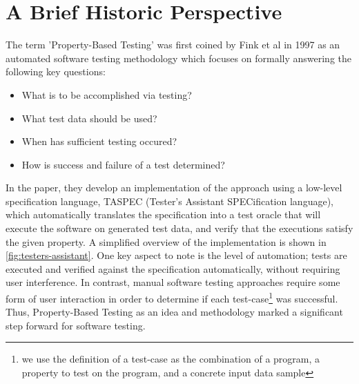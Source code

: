 \documentclass[twoside,11pt,openright]{report}
\newcommand{\pbt}{Property-Based Testing}
\begin{document}
\section{A Brief Historic Perspective}
The term 'Property-Based Testing' was first coined by Fink et al in 1997\cite{fink1997property} as an automated software testing methodology which focuses on formally answering the following key questions:
\begin{itemize}
    \item What is to be accomplished via testing?
    \item What test data should be used?
    \item When has sufficient testing occured?
    \item How is success and failure of a test determined?
\end{itemize}
In the paper, they develop an implementation of the approach using a low-level specification language, TASPEC (Tester's Assistant SPECification language), which automatically translates the specification into a test oracle that will execute the software on generated test data, and verify that the executions satisfy the given property. A simplified overview of the implementation is shown in \autoref{fig:testers-assistant}. One key aspect to note is the level of automation; tests are executed and verified against the specification automatically, without requiring user interference. In contrast, manual software testing approaches require some form of user interaction in order to determine if each test-case\footnote{we use the definition of a test-case as the combination of a program, a property to test on the program, and a concrete input data sample} was successful. Thus, \pbt{} as an idea and methodology marked a significant step forward for software testing.
\end{document}
